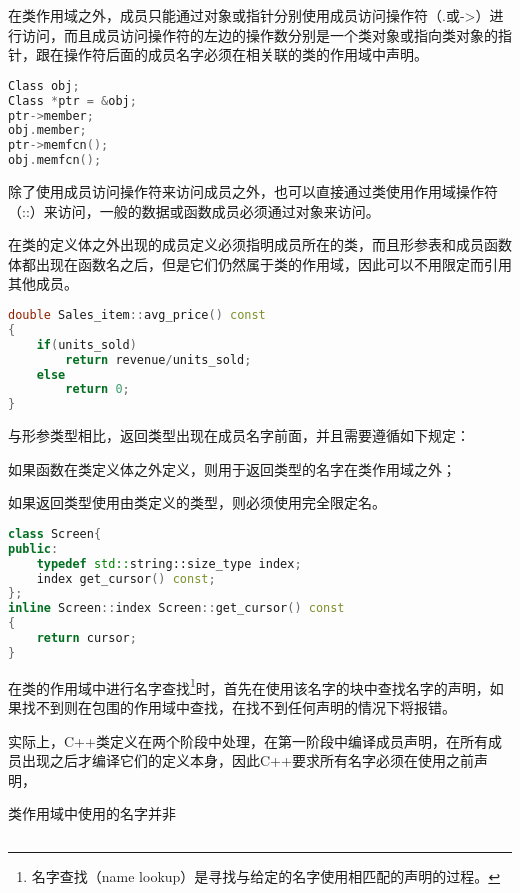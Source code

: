 在类作用域之外，成员只能通过对象或指针分别使用成员访问操作符（.或->）进行访问，而且成员访问操作符的左边的操作数分别是一个类对象或指向类对象的指针，跟在操作符后面的成员名字必须在相关联的类的作用域中声明。




\begin{lstlisting}[language=C++]
Class obj;
Class *ptr = &obj;
ptr->member;
obj.member;
ptr->memfcn();
obj.memfcn();
\end{lstlisting}

除了使用成员访问操作符来访问成员之外，也可以直接通过类使用作用域操作符（::）来访问，一般的数据或函数成员必须通过对象来访问。

在类的定义体之外出现的成员定义必须指明成员所在的类，而且形参表和成员函数体都出现在函数名之后，但是它们仍然属于类的作用域，因此可以不用限定而引用其他成员。

\begin{lstlisting}[language=C++]
double Sales_item::avg_price() const
{
	if(units_sold)
		return revenue/units_sold;
	else
		return 0;
}
\end{lstlisting}

与形参类型相比，返回类型出现在成员名字前面，并且需要遵循如下规定：

\begin{compactitem}
\item 如果函数在类定义体之外定义，则用于返回类型的名字在类作用域之外；
\item 如果返回类型使用由类定义的类型，则必须使用完全限定名。
\end{compactitem}

\begin{lstlisting}[language=C++]
class Screen{
public:
	typedef std::string::size_type index;
	index get_cursor() const;
};
inline Screen::index Screen::get_cursor() const
{
	return cursor;
}
\end{lstlisting}

在类的作用域中进行名字查找\footnote{名字查找（name lookup）是寻找与给定的名字使用相匹配的声明的过程。}时，首先在使用该名字的块中查找名字的声明，如果找不到则在包围的作用域中查找，在找不到任何声明的情况下将报错。

实际上，C++类定义在两个阶段中处理，在第一阶段中编译成员声明，在所有成员出现之后才编译它们的定义本身，因此C++要求所有名字必须在使用之前声明，

类作用域中使用的名字并非

\begin{lstlisting}[language=C++]

\end{lstlisting}




